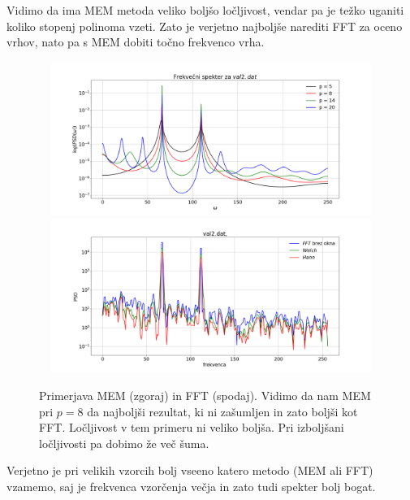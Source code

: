 \documentclass[11pt, a4paper]{article}
\begin{document}
Vidimo da ima MEM metoda veliko boljšo ločljivost, vendar pa je težko uganiti koliko stopenj polinoma vzeti. Zato je verjetno najboljše narediti FFT za oceno vrhov, nato pa s MEM dobiti točno frekvenco vrha.
\begin{figure}[H]
\centering
  \includegraphics[width=16cm,height=5cm]{prva_frekvencni2.png}
  \includegraphics[width=16cm,height=5cm]{prva_tretji1.png}
\caption{Primerjava MEM (zgoraj) in FFT (spodaj). Vidimo da nam MEM pri $p=8$ da najboljši rezultat, ki ni zašumljen in zato boljši kot FFT. Ločljivost v tem primeru ni veliko boljša. Pri izboljšani ločljivosti pa dobimo že več šuma.}
\end{figure}
Verjetno je pri velikih vzorcih bolj vseeno katero metodo (MEM ali FFT) vzamemo, saj je frekvenca vzorčenja večja in zato tudi spekter bolj bogat.
\end{document}
